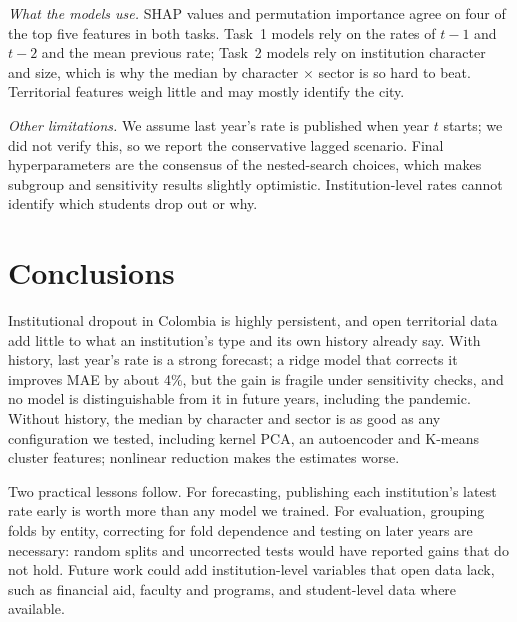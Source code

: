 \documentclass[conference]{IEEEtran}
\begin{document}
\emph{What the models use.} SHAP values and permutation importance agree on four of the top five features in both tasks. Task~1 models rely on the rates of $t-1$ and $t-2$ and the mean previous rate; Task~2 models rely on institution character and size, which is why the median by character $\times$ sector is so hard to beat. Territorial features weigh little and may mostly identify the city.

\emph{Other limitations.} We assume last year's rate is published when year $t$ starts; we did not verify this, so we report the conservative lagged scenario. Final hyperparameters are the consensus of the nested-search choices, which makes subgroup and sensitivity results slightly optimistic. Institution-level rates cannot identify which students drop out or why.

\section{Conclusions}

Institutional dropout in Colombia is highly persistent, and open territorial data add little to what an institution's type and its own history already say. With history, last year's rate is a strong forecast; a ridge model that corrects it improves MAE by about 4\%, but the gain is fragile under sensitivity checks, and no model is distinguishable from it in future years, including the pandemic. Without history, the median by character and sector is as good as any configuration we tested, including kernel PCA, an autoencoder and K-means cluster features; nonlinear reduction makes the estimates worse.

Two practical lessons follow. For forecasting, publishing each institution's latest rate early is worth more than any model we trained. For evaluation, grouping folds by entity, correcting for fold dependence and testing on later years are necessary: random splits and uncorrected tests would have reported gains that do not hold. Future work could add institution-level variables that open data lack, such as financial aid, faculty and programs, and student-level data where available.



\end{document}

